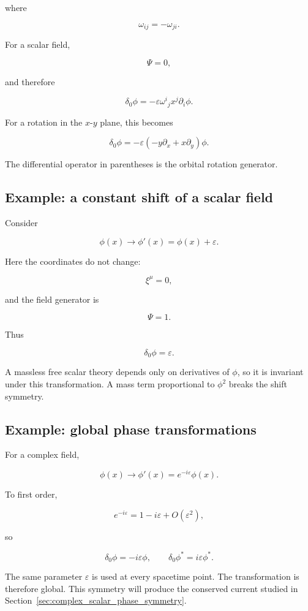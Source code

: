 where

\[
\omega_{ij}
=
-\omega_{ji}.
\]

For a scalar field,

\[
\Psi=0,
\]

and therefore

\[
\delta_0\phi
=
-\varepsilon
\omega^{i}{}_{j}x^{j}\partial_i\phi.
\]

For a rotation in the \(x\)-\(y\) plane, this becomes

\[
\boxed{
\delta_0\phi
=
-\varepsilon
\left(
-y\partial_x+x\partial_y
\right)\phi
}.
\]

The differential operator in parentheses is the orbital rotation generator.

\subsection{Example: a constant shift of a scalar field}

Consider

\[
\phi(x)
\longrightarrow
\phi'(x)
=
\phi(x)+\varepsilon.
\]

Here the coordinates do not change:

\[
\xi^{\mu}=0,
\]

and the field generator is

\[
\Psi=1.
\]

Thus

\[
\boxed{
\delta_0\phi=\varepsilon
}.
\]

A massless free scalar theory depends only on derivatives of \(\phi\), so it is invariant under this transformation. A mass term proportional to \(\phi^{2}\) breaks the shift symmetry.

\subsection{Example: global phase transformations}

For a complex field,

\[
\phi(x)
\longrightarrow
\phi'(x)
=
e^{-i\varepsilon}\phi(x).
\]

To first order,

\[
e^{-i\varepsilon}
=
1-i\varepsilon+O(\varepsilon^{2}),
\]

so

\[
\boxed{
\delta_0\phi
=
-i\varepsilon\phi
},
\qquad
\boxed{
\delta_0\phi^{*}
=
i\varepsilon\phi^{*}
}.
\]

The same parameter \(\varepsilon\) is used at every spacetime point. The transformation is therefore global. This symmetry will produce the conserved current studied in Section~\ref{sec:complex_scalar_phase_symmetry}.

